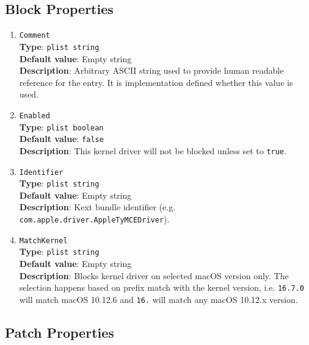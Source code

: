 \documentclass[]{article}
\begin{document}
\subsection{Block Properties}\label{kernelpropsblock}

\begin{enumerate}
\item
  \texttt{Comment}\\
  \textbf{Type}: \texttt{plist\ string}\\
  \textbf{Default value}: Empty string\\
  \textbf{Description}: Arbitrary ASCII string used to provide human readable
  reference for the entry. It is implementation defined whether this value is
  used.

\item
  \texttt{Enabled}\\
  \textbf{Type}: \texttt{plist\ boolean}\\
  \textbf{Default value}: \texttt{false}\\
  \textbf{Description}: This kernel driver will not be blocked unless set to
  \texttt{true}.

\item
  \texttt{Identifier}\\
  \textbf{Type}: \texttt{plist\ string}\\
  \textbf{Default value}: Empty string\\
  \textbf{Description}: Kext bundle identifier
    (e.g. \texttt{com.apple.driver.AppleTyMCEDriver}).

\item
  \texttt{MatchKernel}\\
  \textbf{Type}: \texttt{plist\ string}\\
  \textbf{Default value}: Empty string\\
  \textbf{Description}: Blocks kernel driver on selected macOS version only.
  The selection happens based on prefix match with the kernel version, i.e.
  \texttt{16.7.0} will match macOS 10.12.6 and \texttt{16.} will match
  any macOS 10.12.x version.

\end{enumerate}

\subsection{Patch Properties}\label{kernelpropspatch}
\end{document}
